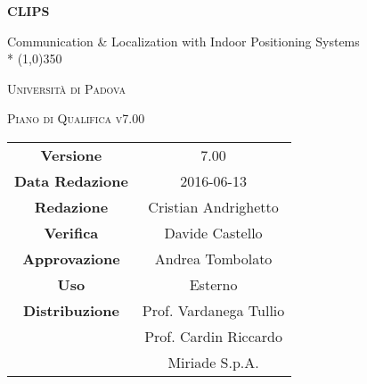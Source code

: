 \documentclass[a4paper,12pt]{article}
\author{Andrighetto Cristian, Castello Davide}
\date{27/12/2015}
\begin{document}
	\begin{titlepage}
		\centering
	{\huge\bfseries CLIPS\par}
	Communication \& Localization with Indoor Positioning Systems \\*
	\line(1,0){350} \\
	{\scshape\LARGE Università di Padova \par}
	\vspace{1cm}
	{\scshape\Large Piano di Qualifica v7.00 \par}
	\logo
	\newpage
		\begin{tabular}{c|c}
			{\hfill \textbf{Versione}} 			& 7.00 				\\
			{\hfill\textbf{Data Redazione}} 		& 2016-06-13	 		\\ 
			{\hfill\textbf{Redazione}} 			& Cristian Andrighetto 		\\ 
			{\hfill\textbf{Verifica}} 			& Davide Castello 		\\
			{\hfill\textbf{Approvazione}} 			& Andrea Tombolato 		\\
			{\hfill\textbf{Uso}} 				& Esterno			\\
			{\hfill\textbf{Distribuzione}} 			& Prof. Vardanega Tullio	\\
									& Prof. Cardin Riccardo 	\\
									& Miriade S.p.A.
		\end{tabular}
	\end{titlepage}
	
	\newpage
	\pagestyle{myfront}
		
	
	\newpage
		\tableofcontents
	
	\newpage
		\listoftables
	
	\label{LastFrontPage}
	\newpage
		\pagestyle{mymain}
		
	\newpage
		
	\newpage
		
	\newpage
		
	\newpage
		
	\newpage
		
	\newpage
		
	
	\newpage
		
	
	\newpage
		
	
	\newpage
		
	
	\newpage
		
	
	\newpage
		
		
	\newpage
		
	
	\newpage
		
		
\label{LastPage}
\end{document}
